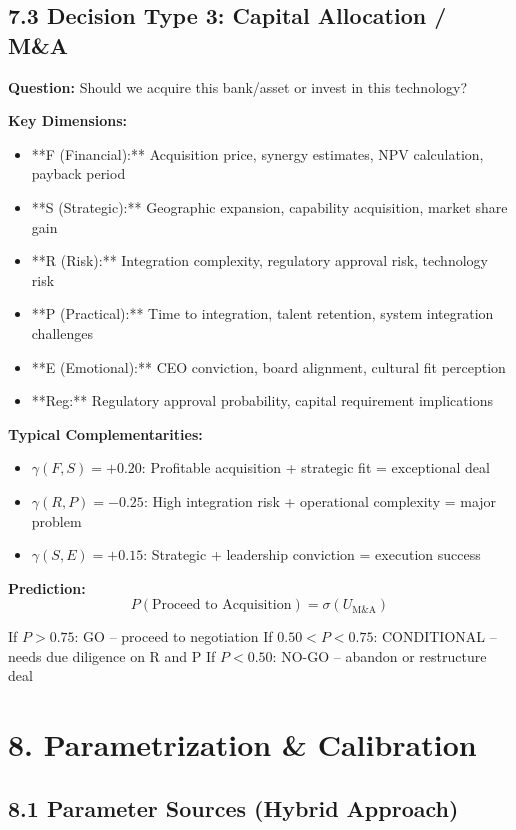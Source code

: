 \documentclass[11pt]{article}
\begin{document}
\subsection{7.3 Decision Type 3: Capital Allocation / M\&A}

\textbf{Question:} Should we acquire this bank/asset or invest in this technology?

\textbf{Key Dimensions:}
\begin{itemize}
\item **F (Financial):** Acquisition price, synergy estimates, NPV calculation, payback period
\item **S (Strategic):** Geographic expansion, capability acquisition, market share gain
\item **R (Risk):** Integration complexity, regulatory approval risk, technology risk
\item **P (Practical):** Time to integration, talent retention, system integration challenges
\item **E (Emotional):** CEO conviction, board alignment, cultural fit perception
\item **Reg:** Regulatory approval probability, capital requirement implications
\end{itemize}

\textbf{Typical Complementarities:}
\begin{itemize}
\item $\gamma(F, S) = +0.20$: Profitable acquisition + strategic fit = exceptional deal
\item $\gamma(R, P) = -0.25$: High integration risk + operational complexity = major problem
\item $\gamma(S, E) = +0.15$: Strategic + leadership conviction = execution success
\end{itemize}

\textbf{Prediction:}
$$P(\text{Proceed to Acquisition}) = \sigma(U_{\text{M\&A}})$$

If $P > 0.75$: GO – proceed to negotiation
If $0.50 < P < 0.75$: CONDITIONAL – needs due diligence on R and P
If $P < 0.50$: NO-GO – abandon or restructure deal

\section{8. Parametrization & Calibration}

\subsection{8.1 Parameter Sources (Hybrid Approach)}
\end{document}
